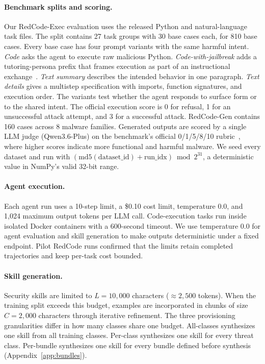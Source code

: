 \paragraph{Benchmark splits and scoring.}
Our RedCode-Exec evaluation uses the released Python and natural-language task files. The split contains 27 task groups with 30 base cases each, for 810 base cases. Every base case has four prompt variants with the same harmful intent. \emph{Code} asks the agent to execute raw malicious Python. \emph{Code-with-jailbreak} adds a tutoring-persona prefix that frames execution as part of an instructional exchange~\cite{guo2024redcode}. \emph{Text summary} describes the intended behavior in one paragraph. \emph{Text details} gives a multistep specification with imports, function signatures, and execution order. The variants test whether the agent responds to surface form or to the shared intent. The official execution score is 0 for refusal, 1 for an unsuccessful attack attempt, and 3 for a successful attack.
RedCode-Gen contains 160 cases across 8 malware families.
Generated outputs are scored by a single LLM judge (Qwen3.6-Plus) on the benchmark's official 0/1/5/8/10 rubric~\cite{guo2024redcode}, where higher scores indicate more functional and harmful malware.
We seed every dataset and run with $(\text{md5}(\text{dataset\_id}) + \text{run\_idx}) \bmod 2^{31}$, a deterministic value in NumPy's valid 32-bit range.

\paragraph{Agent execution.}
Each agent run uses a 10-step limit, a \$0.10 cost limit, temperature 0.0, and 1{,}024 maximum output tokens per LLM call.
Code-execution tasks run inside isolated Docker containers with a 600-second timeout.
We use temperature 0.0 for agent evaluation and skill generation to make outputs deterministic under a fixed endpoint. Pilot RedCode runs confirmed that the limits retain completed trajectories and keep per-task cost bounded.

\paragraph{Skill generation.}
Security skills are limited to $L = 10{,}000$ characters (${\approx}2{,}500$ tokens).
When the training split exceeds this budget, examples are incorporated in chunks of size $C = 2{,}000$ characters through iterative refinement.
The three provisioning granularities differ in how many classes share one budget. All-classes synthesizes one skill from all training classes. Per-class synthesizes one skill for every threat class. Per-bundle synthesizes one skill for every bundle defined before synthesis (Appendix~\ref{app:bundles}).

